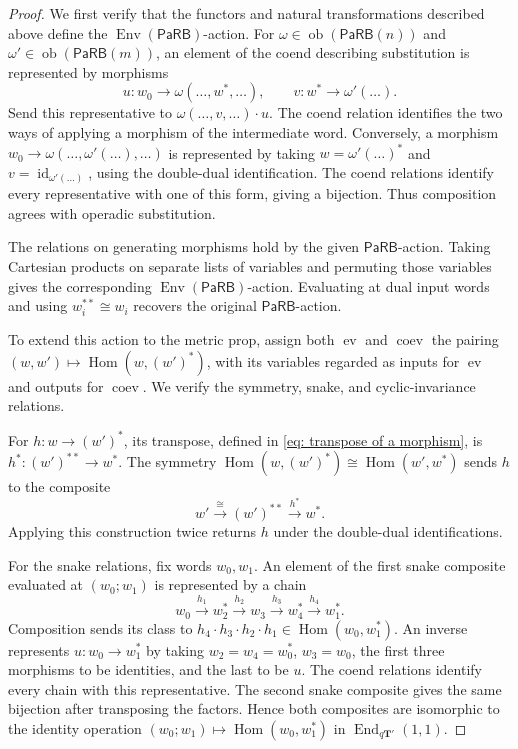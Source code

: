 \documentclass[10pt,a4paper]{amsart}
\newcommand{\End}{\operatorname{End}}
\newcommand{\Env}{\operatorname{Env}}
\newcommand{\Hom}{\operatorname{Hom}}
\newcommand{\PaRB}{\mathsf{PaRB}}
\newcommand{\bT}{\mathbf{T}}
\newcommand{\coev}{\operatorname{coev}}
\newcommand{\ev}{\operatorname{ev}}
\newcommand{\id}{\operatorname{id}}
\newcommand{\ob}{\operatorname{ob}}
\begin{document}
\begin{proof}
We first verify that the functors and natural transformations
described above define the $\Env(\PaRB)$-action.
For $\omega\in\ob(\PaRB(n))$ and
$\omega'\in\ob(\PaRB(m))$, an element of the coend describing
substitution is represented by morphisms
\[
u\colon w_0\longrightarrow\omega(\ldots,w^*,\ldots),
\qquad
v\colon w^*\longrightarrow\omega'(\ldots).
\]
Send this representative to $\omega(\ldots,v,\ldots)\cdot u$.
The coend relation identifies the two ways of applying a morphism
of the intermediate word. Conversely, a morphism
$w_0\to\omega(\ldots,\omega'(\ldots),\ldots)$ is represented
by taking $w=\omega'(\ldots)^*$ and
$v=\id_{\omega'(\ldots)}$, using the double-dual identification.
The coend relations identify every representative with one of
this form, giving a bijection.
Thus composition agrees with operadic substitution.

The relations on generating morphisms hold by the given
$\PaRB$-action. Taking Cartesian products on separate lists of
variables and permuting those variables gives the corresponding
$\Env(\PaRB)$-action. Evaluating at dual input words and using
$w_i^{**}\cong w_i$ recovers the original $\PaRB$-action.

To extend this action to the metric prop, assign both $\ev$
and $\coev$ the pairing
$(w,w')\mapsto\Hom(w,(w')^*)$, with its variables regarded
as inputs for $\ev$ and outputs for $\coev$.
We verify the symmetry, snake, and cyclic-invariance relations.

For $h\colon w\to(w')^*$, its transpose, defined in
\eqref{eq: transpose of a morphism}, is
$h^*\colon(w')^{**}\to w^*$.
The symmetry $\Hom(w,(w')^*)\cong\Hom(w',w^*)$ sends $h$
to the composite
\[
w'\xrightarrow{\cong}(w')^{**}\xrightarrow{h^*}w^*.
\]
Applying this construction twice returns $h$ under the
double-dual identifications.

For the snake relations, fix words $w_0,w_1$. An element of
the first snake composite evaluated at $(w_0;w_1)$ is
represented by a chain
\[
w_0\xrightarrow{h_1}w_2^*
\xrightarrow{h_2}w_3
\xrightarrow{h_3}w_4^*
\xrightarrow{h_4}w_1^*.
\]
Composition sends its class to
$h_4\cdot h_3\cdot h_2\cdot h_1\in\Hom(w_0,w_1^*)$.
An inverse represents $u\colon w_0\to w_1^*$ by taking
$w_2=w_4=w_0^*$, $w_3=w_0$, the first three morphisms to
be identities, and the last to be $u$.
The coend relations identify every chain with this representative.
The second snake composite gives the same bijection after
transposing the factors. Hence both composites are isomorphic
to the identity operation
$(w_0;w_1)\mapsto\Hom(w_0,w_1^*)$
in $\End_{q\bT'}(1,1)$.


\end{proof}
\end{document}
